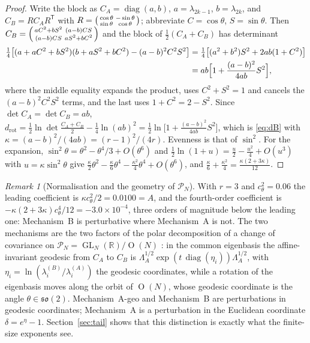 \documentclass[11pt,reqno]{amsart}
\theoremstyle{plain}
\theoremstyle{definition}
\theoremstyle{remark}
\newtheorem{remark}[theorem]{Remark}
\numberwithin{equation}{section}
\DeclareMathOperator{\diag}{diag}
\DeclareMathOperator{\GL}{GL}
\DeclareMathOperator{\Or}{O}
\newcommand{\Rr}{\mathbb{R}}
\newcommand{\CA}{C_A}
\newcommand{\CB}{C_B}
\newcommand{\PN}{\mathcal{P}_N}
\begin{document}
\begin{proof}
Write the block as $\CA=\diag(a,b)$, $a=\lambda_{2k-1}$, $b=\lambda_{2k}$, and $\CB=R\CA R^{\mathsf T}$ with $R=\begin{psmallmatrix}\cos\theta&-\sin\theta\\ \sin\theta&\cos\theta\end{psmallmatrix}$; abbreviate $C=\cos\theta$, $S=\sin\theta$. Then $\CB=\begin{psmallmatrix}aC^2+bS^2&(a-b)CS\\ (a-b)CS&aS^2+bC^2\end{psmallmatrix}$ and the block of $\frac12(\CA+\CB)$ has determinant
\begin{align*}
\tfrac14\bigl[(a+aC^2+bS^2)(b+aS^2+bC^2)-(a-b)^2C^2S^2\bigr]&=\tfrac14\bigl[(a^2+b^2)S^2+2ab(1+C^2)\bigr]\\
&=ab\Bigl[1+\frac{(a-b)^2}{4ab}S^2\Bigr],
\end{align*}
where the middle equality expands the product, uses $C^2+S^2=1$ and cancels the $(a-b)^2C^2S^2$ terms, and the last uses $1+C^2=2-S^2$. Since $\det\CA=\det\CB=ab$, $d_{\mathrm{rot}}=\frac12\ln\det\frac{\CA+\CB}{2}-\frac14\ln(ab)^2=\frac12\ln\bigl[1+\frac{(a-b)^2}{4ab}S^2\bigr]$, which is \eqref{eq:dB} with $\kappa=(a-b)^2/(4ab)=(r-1)^2/(4r)$. Evenness is that of $\sin^2$. For the expansion, $\sin^2\theta=\theta^2-\theta^4/3+O(\theta^6)$ and $\frac12\ln(1+u)=\frac u2-\frac{u^2}4+O(u^3)$ with $u=\kappa\sin^2\theta$ give $\frac\kappa2\theta^2-\frac\kappa6\theta^4-\frac{\kappa^2}4\theta^4+O(\theta^6)$, and $\frac\kappa6+\frac{\kappa^2}4=\frac{\kappa(2+3\kappa)}{12}$.
\end{proof}

\begin{remark}[Normalisation and the geometry of $\PN$]
With $r=3$ and $c_\theta^2=0.06$ the leading coefficient is $\kappa c_\theta^2/2=0.0100=A$, and the fourth-order coefficient is $-\kappa(2+3\kappa)c_\theta^4/12=-3.0\times10^{-4}$, three orders of magnitude below the leading one: Mechanism~B is perturbative where Mechanism~A is not. The two mechanisms are the two factors of the polar decomposition of a change of covariance on $\PN=\GL_N(\Rr)/\Or(N)$ \cite{Bhatia2007,Pennec2006}: in the common eigenbasis the affine-invariant geodesic from $\CA$ to $\CB$ is $\Lambda_A^{1/2}\exp(t\,\diag(\eta_i))\Lambda_A^{1/2}$, with $\eta_i=\ln(\lambda^{(B)}_i/\lambda^{(A)}_i)$ the geodesic coordinates, while a rotation of the eigenbasis moves along the orbit of $\Or(N)$, whose geodesic coordinate is the angle $\theta\in\mathfrak{so}(2)$. Mechanism~A-geo and Mechanism~B are perturbations in geodesic coordinates; Mechanism~A is a perturbation in the Euclidean coordinate $\delta=e^\eta-1$. Section~\ref{sec:tail} shows that this distinction is exactly what the finite-size exponents see.
\end{remark}
\end{document}
